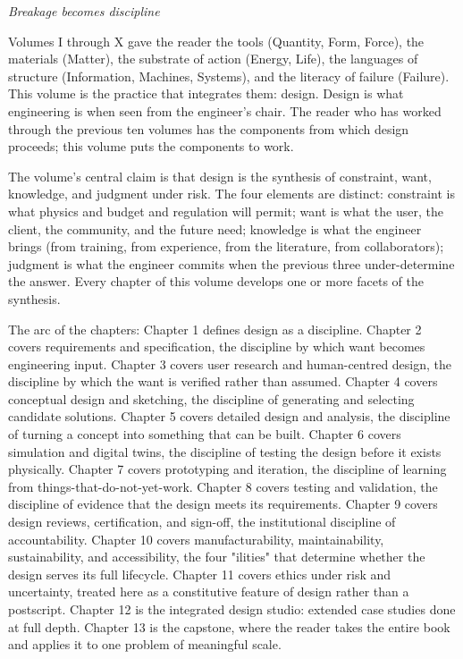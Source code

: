 
\vspace*{1.5cm}
\begin{center}
\itshape\large
Breakage becomes discipline
\end{center}
\vspace{0.5cm}

\noindent
Volumes I through X gave the reader the tools (Quantity, Form, Force), the materials (Matter), the substrate of action (Energy, Life), the languages of structure (Information, Machines, Systems), and the literacy of failure (Failure). This volume is the practice that integrates them: design. Design is what engineering is when seen from the engineer's chair. The reader who has worked through the previous ten volumes has the components from which design proceeds; this volume puts the components to work.

The volume's central claim is that design is the synthesis of constraint, want, knowledge, and judgment under risk. The four elements are distinct: constraint is what physics and budget and regulation will permit; want is what the user, the client, the community, and the future need; knowledge is what the engineer brings (from training, from experience, from the literature, from collaborators); judgment is what the engineer commits when the previous three under-determine the answer. Every chapter of this volume develops one or more facets of the synthesis.

The arc of the chapters: Chapter 1 defines design as a discipline. Chapter 2 covers requirements and specification, the discipline by which want becomes engineering input. Chapter 3 covers user research and human-centred design, the discipline by which the want is verified rather than assumed. Chapter 4 covers conceptual design and sketching, the discipline of generating and selecting candidate solutions. Chapter 5 covers detailed design and analysis, the discipline of turning a concept into something that can be built. Chapter 6 covers simulation and digital twins, the discipline of testing the design before it exists physically. Chapter 7 covers prototyping and iteration, the discipline of learning from things-that-do-not-yet-work. Chapter 8 covers testing and validation, the discipline of evidence that the design meets its requirements. Chapter 9 covers design reviews, certification, and sign-off, the institutional discipline of accountability. Chapter 10 covers manufacturability, maintainability, sustainability, and accessibility, the four "ilities" that determine whether the design serves its full lifecycle. Chapter 11 covers ethics under risk and uncertainty, treated here as a constitutive feature of design rather than a postscript. Chapter 12 is the integrated design studio: extended case studies done at full depth. Chapter 13 is the capstone, where the reader takes the entire book and applies it to one problem of meaningful scale.

